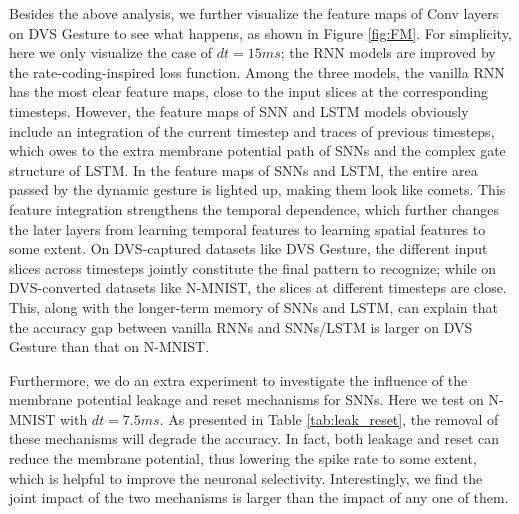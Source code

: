 \documentclass[journal,10pt,twocolumn]{IEEETran}
\begin{document}
Besides the above analysis, we further visualize the feature maps of Conv layers on DVS Gesture to see what happens, as shown in Figure \ref{fig:FM}. For simplicity, here we only visualize the case of $dt=15ms$; the RNN models are improved by the rate-coding-inspired loss function. Among the three models, the vanilla RNN has the most clear feature maps, close to the input slices at the corresponding timesteps. However, the feature maps of SNN and LSTM models obviously include an integration of the current timestep and traces of previous timesteps, which owes to the extra membrane potential path of SNNs and the complex gate structure of LSTM. In the feature maps of SNNs and LSTM, the entire area passed by the dynamic gesture is lighted up, making them look like comets. This feature integration strengthens the temporal dependence, which further changes the later layers from learning temporal features to learning spatial features to some extent. On DVS-captured datasets like DVS Gesture, the different input slices across timesteps jointly constitute the final pattern to recognize; while on DVS-converted datasets like N-MNIST, the slices at different timesteps are close. This, along with the longer-term memory of SNNs and LSTM, can explain that the accuracy gap between vanilla RNNs and SNNs/LSTM is larger on DVS Gesture than that on N-MNIST.

\begin{table}[!htbp]
\caption{Influence of membrane potential leakage and reset. }
\label{tab:leak_reset}
\vspace{2pt}
\centering
\renewcommand\arraystretch{1.3}
\end{table}


Furthermore, we do an extra experiment to investigate the influence of the membrane potential leakage and reset mechanisms for SNNs. Here we test on N-MNIST with $dt=7.5ms$. As presented in Table \ref{tab:leak_reset}, the removal of these mechanisms will degrade the accuracy. In fact, both leakage and reset can reduce the membrane potential, thus lowering the spike rate to some extent, which is helpful to improve the neuronal selectivity. Interestingly, we find the joint impact of the two mechanisms is larger than the impact of any one of them.
\end{document}

